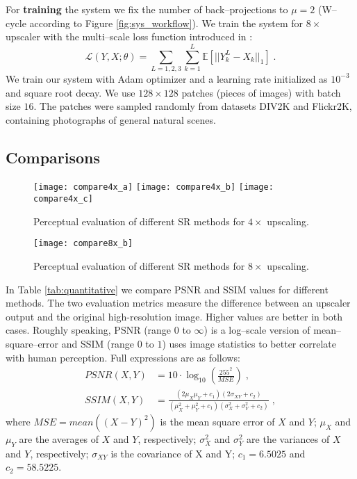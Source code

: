 \documentclass[letterpaper]{article}
\begin{document}
For \textbf{training} the system we fix the number of back--projections to $\mu=2$ (W--cycle according to Figure \ref{fig:sys_workflow}). We train the system for $8\times$ upscaler with the multi--scale loss function introduced in \cite{MSLapSRN}:
\begin{equation}
    \mathcal{L}(Y,X;\theta)=\sum_{L=1,2,3} \sum_{k=1}^L \mathbb{E}\left[ ||Y^L_k-X_k||_1 \right] \;.
\end{equation}
We train our system with Adam optimizer and a learning rate initialized as $10^{-3}$ and square root decay. We use $128\times128$ patches (pieces of images) with batch size $16$. The patches were sampled randomly from datasets DIV2K and Flickr2K, containing photographs of general natural scenes.

\subsection{Comparisons}
\label{ssec:comparisons}
\begin{figure*}[h!]
  \centering
  \texttt{[image: compare4x\_a]}
  \texttt{[image: compare4x\_b]}
  \texttt{[image: compare4x\_c]}
  \caption{Perceptual evaluation of different SR methods for $4\times$ upscaling. \label{fig:perceptual_4x}}
\end{figure*}
\begin{figure*}[h!]
  \centering
  \texttt{[image: compare8x\_b]}
  \caption{Perceptual evaluation of different SR methods for $8\times$ upscaling. \label{fig:perceptual_8x}}
\end{figure*}
In Table \ref{tab:quantitative} we compare PSNR and SSIM values for different methods. The two evaluation metrics measure the difference between an upscaler output and the original high-resolution image. Higher values are better in both cases. Roughly speaking, PSNR (range $0$ to $\infty$) is a log--scale version of mean--square--error and SSIM (range $0$ to $1$) uses image statistics to better correlate with human perception. Full expressions are as follows:
\begin{align}
    PSNR(X,Y) & = 10 \cdot \log_{10}\left(\frac{255^2}{MSE}\right) \;,\\
    SSIM(X,Y) & =\frac{(2\mu_X\mu_Y+c_1)(2\sigma_{XY}+c_2)}{(\mu_X^2+\mu_Y^2+c_1)(\sigma_X^2+\sigma_Y^2+c_2)} \;,
\end{align}
where $MSE=mean((X-Y)^2)$ is the mean square error of $X$ and $Y$; $\mu_X$ and $\mu_Y$ are the averages of $X$ and $Y$, respectively; $\sigma_X^2$ and $\sigma_Y^2$ are the variances of $X$ and $Y$, respectively; $\sigma _{XY}$ is the covariance of X and Y; $c_1=6.5025$ and $c_2=58.5225$.
\end{document}
